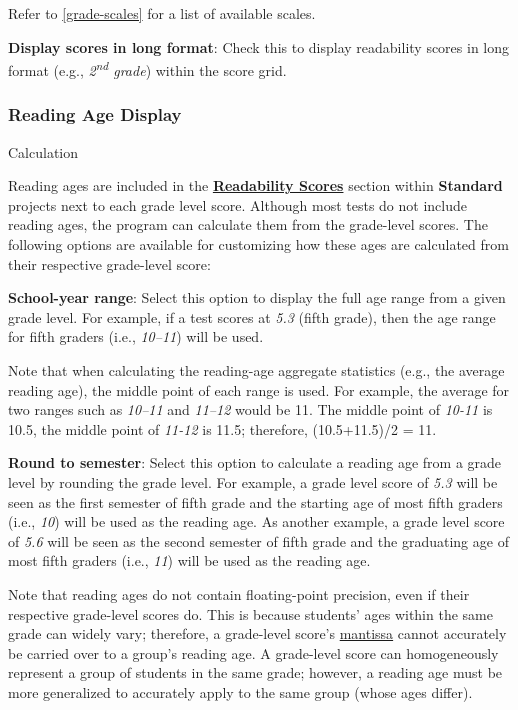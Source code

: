\documentclass[
]{book}
\newenvironment{optionssection}
    {
    \begin{tcolorbox}[colframe=lightgray,colback=ultralightgray,sharp corners=all,parbox=false]
    }
    {
    \end{tcolorbox}
    }
\newenvironment{optionssectiontitle}
    {
    \begin{tcolorbox}[colframe=lightgray,colback=lightgray]
    \bfseries
    }
    {
    \end{tcolorbox}
    }
\theoremstyle{definition}
\theoremstyle{definition}
\theoremstyle{definition}
\theoremstyle{definition}
\theoremstyle{remark}
\begin{document}
Refer to \ref{grade-scales} for a list of available scales.

\textbf{Display scores in long format}: Check this to display readability scores in long format (e.g., \emph{2\textsuperscript{nd} grade}) within the score grid.

\hypertarget{reading-age}{%
\subsubsection*{Reading Age Display}\label{reading-age}}

\begin{optionssection}

\begin{optionssectiontitle}
Calculation

\end{optionssectiontitle}

Reading ages are included in the \protect\hyperlink{reviewing-test-scores}{\textbf{Readability Scores}} section within \textbf{Standard} projects next to each grade level score. Although most tests do not include reading ages, the program can calculate them from the grade-level scores. The following options are available for customizing how these ages are calculated from their respective grade-level score:

\textbf{School-year range}: Select this option to display the full age range from a given grade level. For example, if a test scores at \emph{5.3} (fifth grade), then the age range for fifth graders (i.e., \emph{10--11}) will be used.

Note that when calculating the reading-age aggregate statistics (e.g., the average reading age), the middle point of each range is used. For example, the average for two ranges such as \emph{10--11} and \emph{11--12} would be 11. The middle point of \emph{10-11} is 10.5, the middle point of \emph{11-12} is 11.5; therefore, (10.5+11.5)/2 = 11.

\textbf{Round to semester}: Select this option to calculate a reading age from a grade level by rounding the grade level. For example, a grade level score of \emph{5.3} will be seen as the first semester of fifth grade and the starting age of most fifth graders (i.e., \emph{10}) will be used as the reading age. As another example, a grade level score of \emph{5.6} will be seen as the second semester of fifth grade and the graduating age of most fifth graders (i.e., \emph{11}) will be used as the reading age.

Note that reading ages do not contain floating-point precision, even if their respective grade-level scores do. This is because students' ages within the same grade can widely vary; therefore, a grade-level score's \protect\hyperlink{grade-level-results}{mantissa} cannot accurately be carried over to a group's reading age. A grade-level score can homogeneously represent a group of students in the same grade; however, a reading age must be more generalized to accurately apply to the same group (whose ages differ).

\end{optionssection}
\end{document}
